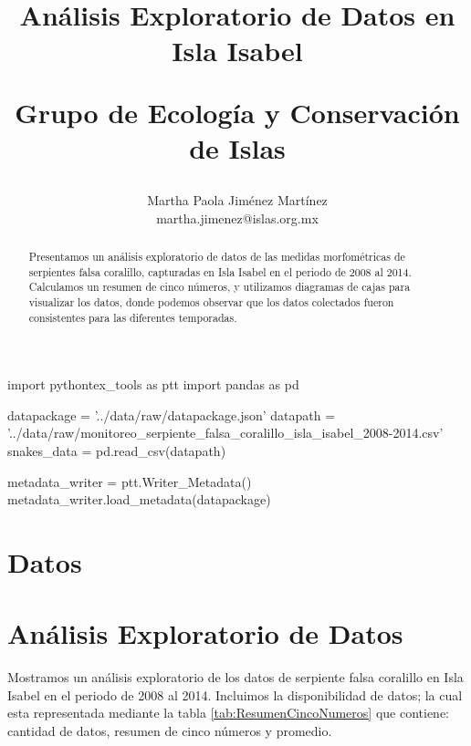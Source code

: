 \documentclass{article}
\begin{document}
 

\begin{pycode}
import pythontex_tools as ptt
import pandas as pd

datapackage = '../data/raw/datapackage.json'
datapath = '../data/raw/monitoreo_serpiente_falsa_coralillo_isla_isabel_2008-2014.csv'
snakes_data = pd.read_csv(datapath)

metadata_writer = ptt.Writer_Metadata() 
metadata_writer.load_metadata(datapackage)

\end{pycode}

\author{Martha Paola Jiménez Martínez \\ 
\small{martha.jimenez@islas.org.mx}} \title{Análisis Exploratorio de Datos en Isla Isabel \\
\begin{large} Grupo de Ecología y Conservación de Islas \end{large}}  

\maketitle

\begin{abstract}
Presentamos un análisis exploratorio de datos de las medidas morfométricas de 
serpientes falsa coralillo, capturadas en Isla  Isabel en el periodo de 2008 al 2014. Calculamos un
resumen de cinco números, y utilizamos diagramas de cajas para visualizar los datos, donde podemos
observar que los datos colectados fueron consistentes para las diferentes temporadas.
\end{abstract}

\section*{Datos}

\section*{Análisis Exploratorio de Datos}
Mostramos un análisis exploratorio de los datos de serpiente falsa coralillo en Isla Isabel en el
periodo de 2008 al 2014. Incluimos la disponibilidad de datos; la cual esta representada mediante la
tabla \ref{tab:ResumenCincoNumeros} que contiene: cantidad de datos, resumen de cinco números y
promedio.
\end{document}
